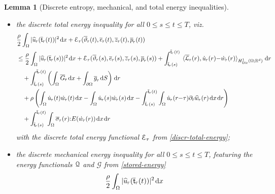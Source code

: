 \documentclass[a4paper,10pt,reqno]{amsart}
\numberwithin{equation}{section}
\newcommand{\R}{\mathbb{R}}
\numberwithin{equation}{section}
\newtheorem{lemma}[theorem]{Lemma}
\def\calG{{\mathcal G}} \def\calH{{\mathcal H}} \def\calI{{\mathcal I}}
\def\dd{\;\!\mathrm{d}} %
\newcommand{\pairing}[4]{ \sideset{_{ #1 }}{_{ #2 }}  {\mathop{\langle #3 , #4
\rangle}}}
\newcommand{\teta}{\vartheta}
\newcommand{\piecewiseConstant}[2]{\overline{#1}_{\kern-1pt#2}}
\newcommand{\pwc}{\piecewiseConstant}
\newcommand{\piecewiseLinear}[2]{{#1}_{\kern-1pt#2}}
\newcommand{\pwl}{\piecewiseLinear}
\newcommand{\pwwll}[2]{\widehat{#1}_{\kern-1pt#2}}
\newcommand{\sig}[1]{E(#1)}
\newcommand{\Dir}{\mathrm{Dir}}
\begin{document}
\begin{lemma}[Discrete entropy, mechanical, and  total energy inequalities]
\begin{itemize}
\begin{equation}
\begin{aligned}
\end{aligned}
\end{equation}
for all $0 \leq s \leq t \leq T$ and
for all $\varphi \in \mathrm{C}^0 ([0,T]; W^{1,\infty}(\Omega)) \cap H^1 (0,T; L^{6/5}(\Omega)) $ with
$\varphi \geq 0$;
\item[-] the \emph{discrete} total energy inequality for all $ 0 \leq s \leq t
\leq  T$, viz.
\begin{equation}
\label{total-enid-discr}
\begin{aligned} & 
\frac{\rho}2 \int_\Omega %
|\pwwll {u}{\tau}(\pwc{\mathsf{t}}{\tau}(t))|^2 
\dd x +  \calE_\tau(\pwc\teta\tau(t),\pwc e\tau(t), \pwc z\tau(t), \pwc p\tau(t))  \\ & \leq \frac{\rho}2 \int_\Omega |\pwwll {u}{\tau}(\pwc{\mathsf{t}}{\tau}(s))|^2  \dd x 
 +  \calE_\tau(\pwc\teta\tau(s),\pwc e \tau(s), \pwc z\tau(s), \pwc p\tau(s)) +   \int_{\pwc{\mathsf{t}}{\tau}(s)}^{\pwc{\mathsf{t}}{\tau}(t)} \pairing{}{H_\Dir^1(\Omega;\R^d)}{\pwc \calL \tau (r) }{\pwl{\dot u}\tau (r) {-} \pwl{ \dot w}\tau (r)} \dd r
 \\ & \quad
 + \int_{\pwc{\mathsf{t}}{\tau}(s)}^{\pwc{\mathsf{t}}{\tau}(t)} \left( 
\int_\Omega  \pwc G\tau  \dd x + 
 \int_{\partial\Omega} \pwc g\tau  \dd S \right)  \dd r \\ & \quad 
 +\rho \left(  \int_\Omega \pwl{\dot u}\tau(t) \pwl{\dot w }\tau(t) \dd x -   \int_\Omega \pwl{\dot u}\tau(s)   \pwl{\dot w }\tau(s) \dd x 
  -   \int_{\pwc{\mathsf{t}}{\tau}(s)}^{\pwc{\mathsf{t}}{\tau}(t)} \int_\Omega \pwl{\dot u}\tau(r{-}\tau) \partial_t \pwwll{ w}{\tau} (r)  \dd x \dd r \right) 
  \\ & \quad   
   +   \int_{\pwc{\mathsf{t}}{\tau}(s)}^{\pwc{\mathsf{t}}{\tau}(t)}\int_\Omega \pwc \sigma\tau (r) {:} \sig{\pwl{\dot w}\tau (r) }  \dd x \dd r 
 \end{aligned}
\end{equation}
 with the discrete total energy functional ${\mathcal E}_\tau$ from 
 \eqref{discr-total-energy}; 
 \item[-] the \emph{discrete} mechanical energy inequality  for all $ 0 \leq s \leq t
\leq  T$,  featuring the energy functionals ${\mathcal Q}$ and $\calG$ from \eqref{stored-energy}
 \begin{equation}
\label{mech-ineq-discr}
\begin{aligned} & 
\frac{\rho}2 \int_\Omega | \pwwll {u}{\tau}(\pwc{\mathsf{t}}{\tau}(t))|^2 \dd x 

\end{aligned}
\end{equation}
\end{itemize}
\end{lemma}
\end{document}
